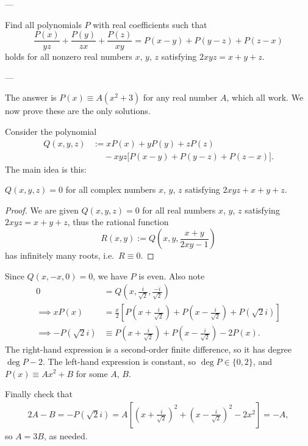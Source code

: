 
---

Find all polynomials $P$ with real coefficients such that \[\frac{P(x)}{yz}+\frac{P(y)}{zx}+\frac{P(z)}{xy}=P(x-y)+P(y-z)+P(z-x)\]
holds for all nonzero real numbers $x$, $y$, $z$ satisfying $2xyz=x+y+z$.

---

The answer is $P(x)\equiv A(x^2+3)$ for any real number $A$, which all work. We now prove these are the only solutions.

Consider the polynomial
\begin{align*}
    Q(x,y,z)&:=xP(x)+yP(y)+zP(z)\\
    &\;\quad-xyz\big[P(x-y)+P(y-z)+P(z-x)\big].
\end{align*}
The main idea is this:
\begin{claim*}
    $Q(x,y,z)=0$ for all complex numbers $x$, $y$, $z$ satisfying $2xyz+x+y+z$.
\end{claim*}
\begin{proof}
We are given $Q(x,y,z)=0$ for all real numbers $x$, $y$, $z$ satisfying $2xyz=x+y+z$, thus the rational function \[R(x,y):=Q\left(x,y,\frac{x+y}{2xy-1}\right)\]
has infinitely many roots, i.e.\ $R\equiv0$.
\end{proof}

Since $Q(x,-x,0)=0$, we have $P$ is even. Also note
\begin{align*}
    0&=Q\left(x,\frac i{\sqrt2},\frac{-i}{\sqrt2}\right)\\
    \implies xP(x)&=\frac x2\left[P\left(x+\frac i{\sqrt2}\right)+P\left(x-\frac i{\sqrt2}\right)+P(\sqrt2i)\right]\\
    \implies-P(\sqrt2i)&\equiv P\left(x+\frac i{\sqrt2}\right)+P\left(x-\frac i{\sqrt2}\right)-2P(x).
\end{align*}
The right-hand expression is a second-order finite difference, so it has degree $\deg P-2$. The left-hand expression is constant, so $\deg P\in\{0,2\}$, and $P(x)\equiv Ax^2+B$ for some $A$, $B$.

Finally check that
\begin{align*}
    2A-B=-P(\sqrt2i)=A\left[\left(x+\frac i{\sqrt2}\right)^2+\left(x-\frac i{\sqrt2}\right)^2-2x^2\right]=-A,
\end{align*}
so $A=3B$, as needed.

